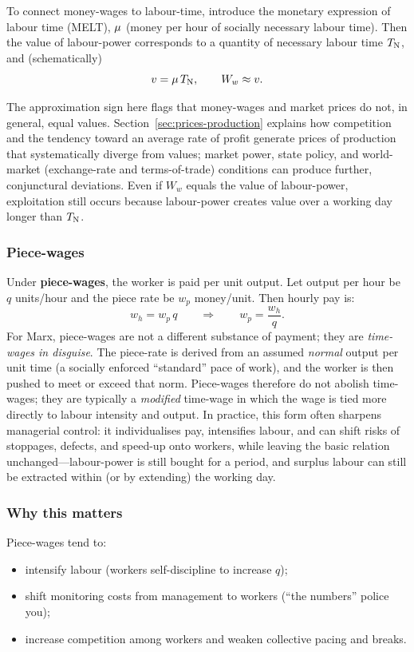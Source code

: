 To connect money-wages to labour-time, introduce the monetary expression of labour time
(MELT), $\mu$ (money per hour of socially necessary labour time). Then the value of
labour-power corresponds to a quantity of necessary labour time $T_{\mathrm{N}}$, and (schematically)
\[
  v = \mu \, T_{\mathrm{N}},
  \qquad
  W_w \approx v.
\]

The approximation sign here flags that money-wages and market prices do not, in general,
equal values. Section~\ref{sec:prices-production} explains how competition and the tendency
toward an average rate of profit generate prices of production that systematically diverge
from values; market power, state policy, and world-market (exchange-rate and terms-of-trade)
conditions can produce further, conjunctural deviations. Even if $W_w$ equals the value of labour-power, exploitation still occurs
because labour-power creates value over a working day longer than $T_{\mathrm{N}}$.


\subsubsection*{Piece-wages}

Under \textbf{piece-wages}, the worker is paid per unit output. Let output per hour be
$q$ units/hour and the piece rate be $w_p$ money/unit. Then hourly pay is:
\[
  w_h = w_p \, q
  \qquad\Rightarrow\qquad
  w_p = \frac{w_h}{q}.
\]
For Marx, piece-wages are not a different substance of payment; they are
\emph{time-wages in disguise}. The piece-rate is derived from an assumed \emph{normal} output
per unit time (a socially enforced ``standard'' pace of work), and the worker is then pushed
to meet or exceed that norm. Piece-wages therefore do not abolish time-wages; they are typically
a \emph{modified} time-wage in which the wage is tied more directly to labour intensity and output.
In practice, this form often sharpens managerial control: it individualises pay, intensifies labour,
and can shift risks of stoppages, defects, and speed-up onto workers, while leaving the basic relation
unchanged---labour-power is still bought for a period, and surplus labour can still be extracted within
(or by extending) the working day.


\subsubsection*{Why this matters}

Piece-wages tend to:
\begin{itemize}[leftmargin=1.5em]
  \item intensify labour (workers self-discipline to increase $q$);
  \item shift monitoring costs from management to workers (``the numbers'' police you);
  \item increase competition among workers and weaken collective pacing and breaks.
\end{itemize}


